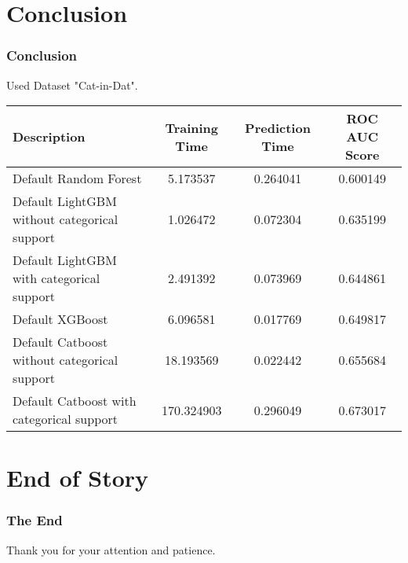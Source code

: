 \documentclass{beamer}
\begin{document}
    \section{Conclusion}
    \begin{frame}
        \fontsize{6.5pt}{6.5}\selectfont
        \frametitle{Conclusion}
        Used Dataset "Cat-in-Dat".
        \begin{table}[htb]
            \begin{center}
            {\renewcommand{\arraystretch}{1.5}
            \renewcommand{\tabcolsep}{0.05cm}
                \begin{tabular}[c]{|l|c|c|c|}
                    \hline
                    \textbf{Description}                         & \textbf{Training Time} & \textbf{Prediction Time} & \textbf{ROC AUC Score} \\
                    \hline
                    Default Random Forest                        & 5.173537               & 0.264041                 & 0.600149               \\
                    \hline
                    Default LightGBM without categorical support & 1.026472               & 0.072304                 & 0.635199               \\
                    \hline
                    Default LightGBM with categorical support    & 2.491392               & 0.073969                 & 0.644861               \\
                    \hline
                    Default XGBoost                              & 6.096581               & 0.017769                 & 0.649817               \\
                    \hline
                    Default Catboost without categorical support & 18.193569              & 0.022442                 & 0.655684               \\
                    \hline
                    Default Catboost with categorical support    & 170.324903             & 0.296049                 & 0.673017               \\
                    \hline
                \end{tabular}}
            \end{center}
        \end{table}


    \end{frame}


    \section{End of Story}
    \begin{frame}
        \frametitle{The End}
        Thank you for your attention and patience.
    \end{frame}
\end{document}
